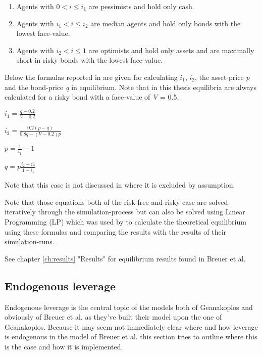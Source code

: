 \documentclass[../Bachelorarbeit.tex]{subfiles}
\begin{document}
\begin{enumerate}
\item Agents with $0 < i \leq i_{1}$ are pessimists and hold only cash.
\item Agents with $i_{1} < i \leq i_{2}$ are median agents and hold only bonds with the lowest face-value.
\item Agents with $i_{2} < i \leq 1$ are optimists and hold only assets and are maximally short in risky bonds with the lowest face-value.
\end{enumerate} 

Below the formulas reported in \cite{Breuer2015} are given for calculating $i_{1}$, $i_{2}$, the asset-price \textit{p} and the bond-price \textit{q} in equilibrium. Note that in this thesis equilibria are always calculated for a risky bond with a face-value of \textit{V} = 0.5.

\begin{center}
$i_{1} = \frac{q - 0.2}{V - 0.2}$
\end{center}

\begin{center}
$i_{2} = \frac{0.2(p - q)}{0.8q - (V - 0.2)p}$
\end{center}

\begin{center}
$p = \frac{1}{i_{1}} - 1$
\end{center}

\begin{center}
$q = p \frac{i_{2} - i{1}}{1 - i_{1}}$
\end{center}

Note that this case is not discussed in \cite{Geanakoplos2009} where it is excluded by assumption.

\medskip

Note that those equations both of the risk-free and risky case are solved iteratively through the simulation-process but can also be solved using Linear Programming (LP) which was used by \cite{Breuer2015} to calculate the theoretical equilibrium using these formulas and comparing the results with the results of their simulation-runs.

\medskip

See chapter \ref{ch:results} "Results" for equilibrium results found in Breuer et al.

\subsection{Endogenous leverage}
Endogenous leverage is the central topic of the models both of Geanakoplos and obviously of Breuer et al. as they've built their model upon the one of Geanakoplos. Because it may seem not immediately clear where and how leverage is endogenous in the model of Breuer et al. this section tries to outline where this is the case and how it is implemented. 
\end{document}
